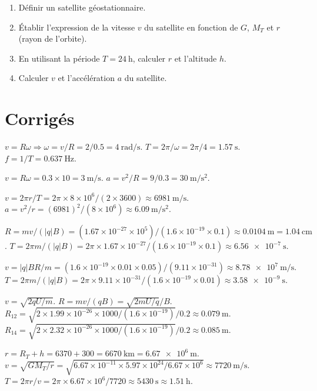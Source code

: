 \begin{enumerate}[label=\arabic*)]
\item Définir un satellite géostationnaire.
\item Établir l'expression de la vitesse $v$ du satellite en fonction de $G$, $M_T$ et $r$ (rayon de l'orbite).
\item En utilisant la période $T=\SI{24}{\hour}$, calculer $r$ et l'altitude $h$.
\item Calculer $v$ et l'accélération $a$ du satellite.
\end{enumerate}

\section{Corrigés}

$v = R\omega \Rightarrow \omega = v/R = 2/0.5 = \SI{4}{\radian\per\second}$. $T = 2\pi/\omega = 2\pi/4 = \SI{1.57}{\second}$. $f = 1/T = \SI{0.637}{\hertz}$.

$v = R\omega = 0.3\times10 = \SI{3}{\metre\per\second}$. $a = v^2/R = 9/0.3 = \SI{30}{\metre\per\second\squared}$.

$v = 2\pi r/T = 2\pi\times8\times10^6/(2\times3600) \approx \SI{6981}{\metre\per\second}$. $a = v^2/r = (6981)^2/(8\times10^6) \approx \SI{6.09}{\metre\per\second\squared}$.

$R = mv/(|q|B) = (1.67\times10^{-27}\times10^5)/(1.6\times10^{-19}\times0.1) \approx \SI{0.0104}{\metre} = \SI{1.04}{\centi\metre}$. $T = 2\pi m/(|q|B) = 2\pi\times1.67\times10^{-27}/(1.6\times10^{-19}\times0.1) \approx \SI{6.56e-7}{\second}$.

$v = |q|BR/m = (1.6\times10^{-19}\times0.01\times0.05)/(9.11\times10^{-31}) \approx \SI{8.78e7}{\metre\per\second}$. $T = 2\pi m/(|q|B) = 2\pi\times9.11\times10^{-31}/(1.6\times10^{-19}\times0.01) \approx \SI{3.58e-9}{\second}$.

$v = \sqrt{2qU/m}$. $R = mv/(qB) = \sqrt{2mU/q}/B$. $R_{12} = \sqrt{2\times1.99\times10^{-26}\times1000/(1.6\times10^{-19})}/0.2 \approx \SI{0.079}{\metre}$. $R_{14} = \sqrt{2\times2.32\times10^{-26}\times1000/(1.6\times10^{-19})}/0.2 \approx \SI{0.085}{\metre}$.

$r = R_T + h = 6370 + 300 = \SI{6670}{\kilo\metre} = \SI{6.67e6}{\metre}$. $v = \sqrt{GM_T/r} = \sqrt{6.67\times10^{-11}\times5.97\times10^{24}/6.67\times10^6} \approx \SI{7720}{\metre\per\second}$. $T = 2\pi r/v = 2\pi\times6.67\times10^6/7720 \approx \SI{5430}{\second} \approx \SI{1.51}{\hour}$.

